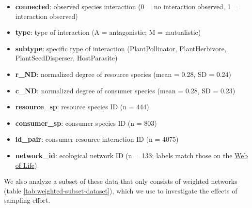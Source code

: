 \documentclass[11pt,]{article}
\providecommand{\tightlist}{%
  \setlength{\itemsep}{0pt}\setlength{\parskip}{0pt}}
\begin{document}
\begin{itemize}
\tightlist
\item
  \textbf{connected}: observed species interaction (0 = no interaction
  observed, 1 = interaction observed)
\item
  \textbf{type}: type of interaction (A = antagonistic; M = mutualistic)
\item
  \textbf{subtype}: specific type of interaction (PlantPollinator,
  PlantHerbivore, PlantSeedDisperser, HostParasite)
\item
  \textbf{r\_ND}: normalized degree of resource species (mean = 0.28, SD
  = 0.24)
\item
  \textbf{c\_ND}: normalized degree of consumer species (mean = 0.28, SD
  = 0.23)
\item
  \textbf{resource\_sp}: resource species ID (n = 444)
\item
  \textbf{consumer\_sp}: consumer species ID (n = 803)
\item
  \textbf{id\_pair}: consumer-resource interaction ID (n = 4075)
\item
  \textbf{network\_id}: ecological network ID (n = 133; labels match
  those on the \href{http://www.web-of-life.es/}{Web of Life})
\end{itemize}

We also analyze a subset of these data that only consists of weighted
networks (table \ref{tab:weighted-subset-dataset}), which we use to
investigate the effects of sampling effort.
\end{document}
